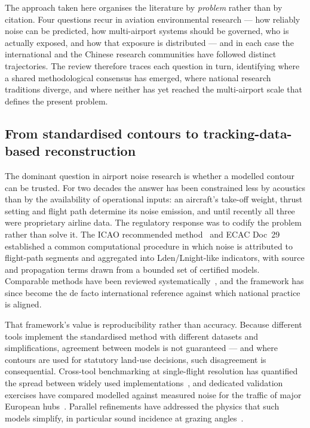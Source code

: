 \documentclass[review,12pt]{elsarticle}
\begin{document}
The approach taken here organises the literature by \emph{problem} rather than by
citation. Four questions recur in aviation environmental research --- how
reliably noise can be predicted, how multi-airport systems should be governed,
who is actually exposed, and how that exposure is distributed --- and in each
case the international and the Chinese research communities have followed
distinct trajectories. The review therefore traces each question in turn,
identifying where a shared methodological consensus has emerged, where national
research traditions diverge, and where neither has yet reached the
multi-airport scale that defines the present problem.

\subsection{From standardised contours to tracking-data-based reconstruction}
\label{sec:lr-noise}

The dominant question in airport noise research is whether a modelled contour
can be trusted. For two decades the answer has been constrained less by
acoustics than by the availability of operational inputs: an aircraft's
take-off weight, thrust setting and flight path determine its noise emission,
and until recently all three were proprietary airline data. The regulatory
response was to codify the problem rather than solve it. The ICAO
recommended method~\citep{icao2018recommended} and ECAC Doc~29
\citep{ecac2016ceac} established a common computational procedure in which
noise is attributed to flight-path segments and aggregated into
Lden/Lnight-like indicators, with source and propagation terms drawn from a
bounded set of certified models. Comparable methods have been reviewed
systematically~\citep{zaporozhets2016aircraft}, and the framework has since
become the de facto international reference against which national practice is
aligned.

That framework's value is reproducibility rather than accuracy. Because
different tools implement the standardised method with different datasets and
simplifications, agreement between models is not guaranteed --- and where
contours are used for statutory land-use decisions, such disagreement is
consequential. Cross-tool benchmarking at single-flight resolution has
quantified the spread between widely used
implementations~\citep{meister2021comparison}, and dedicated validation
exercises have compared modelled against measured noise for the traffic of major
European hubs~\citep{giladi2024validating, simons2022comparative}. Parallel
refinements have addressed the physics that such models simplify, in particular
sound incidence at grazing angles~\citep{wunderli2022aircraft}.
\end{document}
